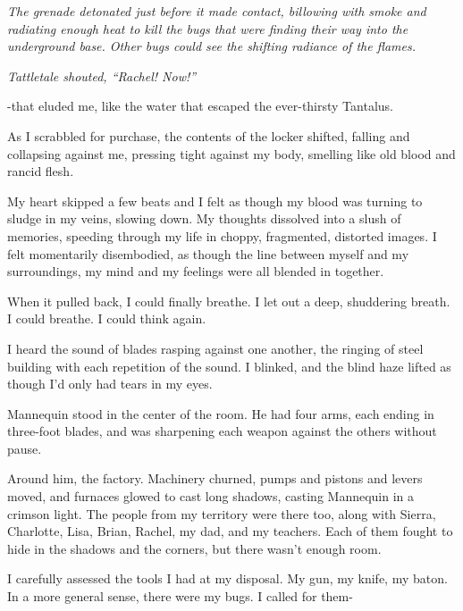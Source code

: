 \emph{The grenade detonated just before it made contact, billowing with smoke and radiating enough heat to kill the bugs that were finding their way into the underground base.  Other bugs could see the shifting radiance of the flames.}



\emph{Tattletale shouted, ``Rachel!  Now!''}



\sectionbreak



-that eluded me, like the water that escaped the ever-thirsty Tantalus.



As I scrabbled for purchase, the contents of the locker shifted, falling and collapsing against me, pressing tight against my body, smelling like old blood and rancid flesh.



My heart skipped a few beats and I felt as though my blood was turning to sludge in my veins, slowing down.  My thoughts dissolved into a slush of memories, speeding through my life in choppy, fragmented, distorted images.  I felt momentarily disembodied, as though the line between myself and my surroundings, my mind and my feelings were all blended in together.



When it pulled back, I could finally breathe.  I let out a deep, shuddering breath.  I could breathe.  I could think again.



I heard the sound of blades rasping against one another, the ringing of steel building with each repetition of the sound.  I blinked, and the blind haze lifted as though I'd only had tears in my eyes.



Mannequin stood in the center of the room.  He had four arms, each ending in three-foot blades, and was sharpening each weapon against the others without pause.



Around him, the factory.  Machinery churned, pumps and pistons and levers moved, and furnaces glowed to cast long shadows, casting Mannequin in a crimson light.  The people from my territory were there too, along with Sierra, Charlotte, Lisa, Brian, Rachel, my dad, and my teachers.  Each of them fought to hide in the shadows and the corners, but there wasn't enough room.



I carefully assessed the tools I had at my disposal.  My gun, my knife, my baton.  In a more general sense, there were my bugs.  I called for them-



